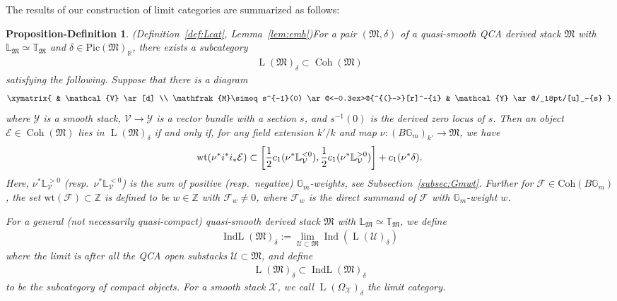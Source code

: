 \documentclass [11pt,oneside,a4paper,mathscr]{amsart}
\makeatletter
\newtheorem{propdef}[thm]{Proposition-Definition}
\theoremstyle{definition}
\newcommand{\LL}{\operatorname{L}}
\newcommand{\X}{\mathcal{X}}
\newcommand{\bgm}{B\mathbb{G}_m}
\newcommand{\Coh}{\operatorname{Coh}}
\newcommand{\Ind}{\operatorname{Ind}}
\newcommand{\IndL}{\operatorname{IndL}}
\newcommand{\inclusion}{\ar@<-0.3ex>@{^{(}->}[r]}
\newcommand{\wt}{\mathrm{wt}}
\makeatother
\begin{document}
The results of our construction of limit categories are summarized as follows: 
\begin{propdef}\emph{(Definition~\ref{def:Lcat}, Lemma~\ref{lem:emb})}\label{intro:propdef}
For a pair $(\mathfrak{M}, \delta)$ of a quasi-smooth QCA derived stack $\mathfrak{M}$
with $\mathbb{L}_{\mathfrak{M}}\simeq \mathbb{T}_{\mathfrak{M}}$ and $\delta \in \mathrm{Pic}(\mathfrak{M})_{\mathbb{R}}$, 
there exists a subcategory 
\begin{align*}
     \LL(\mathfrak{M})_{\delta} \subset \Coh(\mathfrak{M})
\end{align*}
    satisfying the following. Suppose that there is a diagram 
   \begin{align*}%
\xymatrix{
& \mathcal{V} \ar[d] \\
\mathfrak{M}\simeq s^{-1}(0) \inclusion^-{i} & \mathcal{Y} \ar@/_18pt/[u]_-{s}
}
\end{align*}
where $\mathcal{Y}$ is a smooth stack, $\mathcal{V} \to \mathcal{Y}$ is a vector bundle 
with a section $s$, and 
$s^{-1}(0)$ is the derived zero locus of $s$. Then 
an object $\mathcal{E} \in \Coh(\mathfrak{M})$ lies in 
$\LL(\mathfrak{M})_{\delta}$ if and only if, for any field extension $k'/k$ and 
map $\nu \colon (\bgm)_{k'} \to \mathfrak{M}$, we have 
\begin{align}\notag
    \wt(\nu^{\ast}i^{\ast}i_{\ast}\mathcal{E})
    \subset \left[\frac{1}{2} c_1 (\nu^{\ast}\mathbb{L}_{\mathcal{V}}^{<0}), 
    \frac{1}{2} c_1 (\nu^{\ast}\mathbb{L}_{\mathcal{V}}^{>0})
    \right]+c_1(\nu^{\ast}\delta). 
\end{align} 
Here, $\nu^* \mathbb{L}_{\mathcal{V}}^{>0}$ (resp.~$\nu^* \mathbb{L}_{\mathcal{V}}^{<0}$)
is the sum of positive (resp.~negative) $\mathbb{G}_m$-weights, see Subsection~\ref{subsec:Gmwt}. Further for $\mathcal{F}\in\mathrm{Coh}(\bgm)$, the set $\wt(\mathcal{F}) \subset \mathbb{Z}$ is defined to be 
$w\in \mathbb{Z}$ with $\mathcal{F}_w \neq 0$, where $\mathcal{F}_w$ is the direct summand of $\mathcal{F}$ with $\mathbb{G}_m$-weight $w$. 

For a general (not necessarily quasi-compact) quasi-smooth derived stack 
$\mathfrak{M}$ with $\mathbb{L}_{\mathfrak{M}}\simeq \mathbb{T}_{\mathfrak{M}}$, we define 
\begin{align*}
    \IndL(\mathfrak{M})_{\delta}:=\lim_{\mathcal{U}\subset \mathfrak{M}} \Ind(\LL(\mathcal{U})_{\delta})
\end{align*}
where the limit is after all the QCA open substacks $\mathcal{U}\subset \mathfrak{M}$, and define 
\begin{align*}
    \LL(\mathfrak{M})_{\delta} \subset \IndL(\mathfrak{M})_{\delta}
\end{align*}
to be the subcategory of compact objects. 
For a smooth stack $\mathcal{X}$, we 
call $\LL(\Omega_{\X})_{\delta}$ the limit category. 
\end{propdef}
\end{document}
